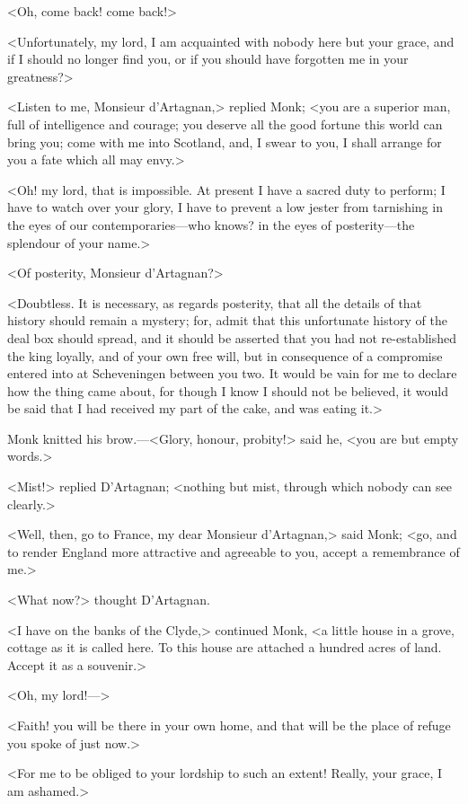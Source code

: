 <Oh, come back! come back!>

<Unfortunately, my lord, I am acquainted with nobody here but your grace, and if I should no longer find you, or if you should have forgotten me in your greatness?>

<Listen to me, Monsieur d'Artagnan,> replied Monk; <you are a superior man, full of intelligence and courage; you deserve all the good fortune this world can bring you; come with me into Scotland, and, I swear to you, I shall arrange for you a fate which all may envy.>

<Oh! my lord, that is impossible. At present I have a sacred duty to perform; I have to watch over your glory, I have to prevent a low jester from tarnishing in the eyes of our contemporaries—who knows? in the eyes of posterity—the splendour of your name.>

<Of posterity, Monsieur d'Artagnan?>

<Doubtless. It is necessary, as regards posterity, that all the details of that history should remain a mystery; for, admit that this unfortunate history of the deal box should spread, and it should be asserted that you had not re-established the king loyally, and of your own free will, but in consequence of a compromise entered into at Scheveningen between you two. It would be vain for me to declare how the thing came about, for though I know I should not be believed, it would be said that I had received my part of the cake, and was eating it.>

Monk knitted his brow.—<Glory, honour, probity!> said he, <you are but empty words.>

<Mist!> replied D'Artagnan; <nothing but mist, through which nobody can see clearly.>

<Well, then, go to France, my dear Monsieur d'Artagnan,> said Monk; <go, and to render England more attractive and agreeable to you, accept a remembrance of me.>

<What now?> thought D'Artagnan.

<I have on the banks of the Clyde,> continued Monk, <a little house in a grove, cottage as it is called here. To this house are attached a hundred acres of land. Accept it as a souvenir.>

<Oh, my lord!—>

<Faith! you will be there in your own home, and that will be the place of refuge you spoke of just now.>

<For me to be obliged to your lordship to such an extent! Really, your grace, I am ashamed.>


